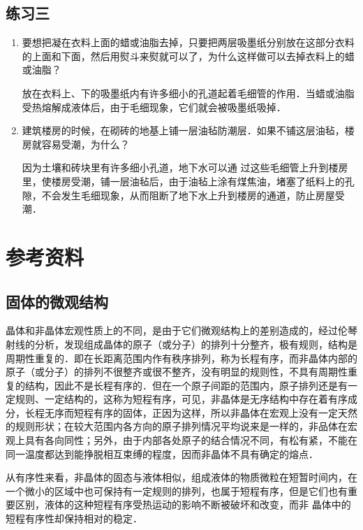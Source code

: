 \subsection{练习三}
\begin{enumerate}
   \item 要想把凝在衣料上面的蜡或油脂去掉，只要把两层吸墨纸分别放在这部分衣料的上面和下面，然后用熨斗来熨就可以了，为什么这样做可以去掉衣料上的蜡或油脂？

   \begin{solution}
    放在衣料上、下的吸墨纸内有许多细小的孔道起着毛细管的作用．当蜡或油脂受热熔解成液体后，由于毛细现象，它们就会被吸墨纸吸掉．
   \end{solution}
\item 建筑楼房的时候，在砌砖的地基上铺一层油毡防潮层．如果不铺这层油毡，楼房就容易受潮，为什么？

\begin{solution}
    因为土壤和砖块里有许多细小孔道，地下水可以通
    过这些毛细管上升到楼房里，使楼房受潮，铺一层油毡后，由于油毡上涂有煤焦油，堵塞了纸料上的孔隙，不会发生毛细现象，从而阻断了地下水上升到楼房的通道，防止房屋受潮．
\end{solution}
\end{enumerate}

\section{参考资料}
\subsection{固体的微观结构}

晶体和非晶体宏观性质上的不同，是由于它们微观结构上的差别造成的，经过伦琴射线的分析，发现组成晶体的原子（或分子）的排列十分整齐，极有规则，结构是周期性重复的．即在长距离范围内作有秩序排列，称为长程有序，而非晶体内部的原子（或分子）的排列不很整齐或很不整齐，没有明显的规则性，不具有周期性重复的结构，因此不是长程有序的．但在一个原子间距的范围内，原子排列还是有一定规则、一定结构的，这称为短程有序，可见，非晶体是无序结构中存在着有序成分，长程无序而短程有序的固体，正因为这样，所以非晶体在宏观上没有一定天然的规则形状；在较大范围内各方向的原子排列情况平均说来是一样的，非品体在宏观上具有各向同性；另外，由于内部各处原子的结合情况不同，有松有紧，不能在同一温度都达到能挣脱相互束缚的程度，因而非晶体不具有确定的熔点．

从有序性来看，非晶体的固态与液体相似，组成液体的物质微粒在短暂时间内，在一个微小的区域中也可保持有一定规则的排列，也属于短程有序，但是它们也有重要区别，液体的这种短程有序受热运动的影响不断被破坏和改变，而非
晶体中的短程有序性却保持相对的稳定．

